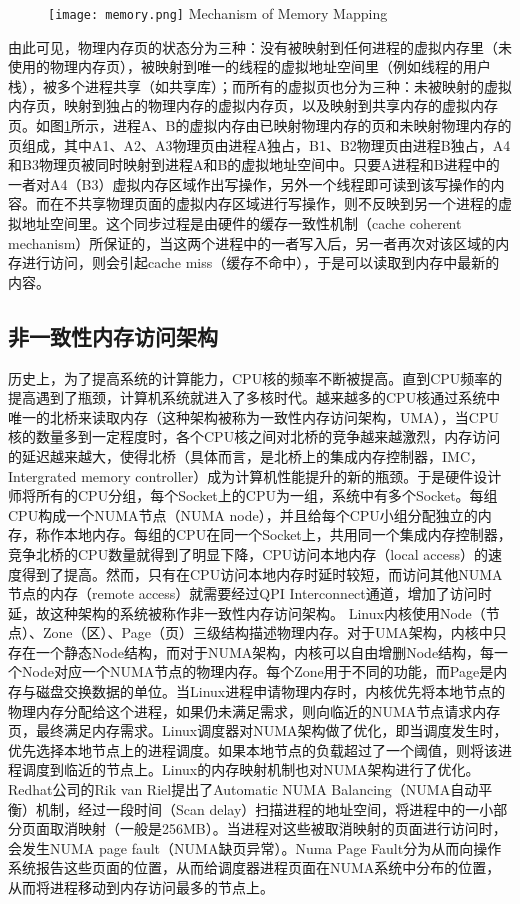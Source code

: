 \begin{figure}[!htp]
  \centering
  \texttt{[image: memory.png]}
    {Mechanism of Memory Mapping}
  \label{fig:MEM}
\end{figure}
由此可见，物理内存页的状态分为三种：没有被映射到任何进程的虚拟内存里（未使用的物理内存页），被映射到唯一的线程的虚拟地址空间里（例如线程的用户栈），被多个进程共享（如共享库）；而所有的虚拟页也分为三种：未被映射的虚拟内存页，映射到独占的物理内存的虚拟内存页，以及映射到共享内存的虚拟内存页。如图\ref{fig:MEM}所示，进程A、B的虚拟内存由已映射物理内存的页和未映射物理内存的页组成，其中A1、A2、A3物理页由进程A独占，B1、B2物理页由进程B独占，A4和B3物理页被同时映射到进程A和B的虚拟地址空间中。只要A进程和B进程中的一者对A4（B3）虚拟内存区域作出写操作，另外一个线程即可读到该写操作的内容。而在不共享物理页面的虚拟内存区域进行写操作，则不反映到另一个进程的虚拟地址空间里。这个同步过程是由硬件的缓存一致性机制（cache coherent mechanism）所保证的，当这两个进程中的一者写入后，另一者再次对该区域的内存进行访问，则会引起cache miss（缓存不命中），于是可以读取到内存中最新的内容。
\subsection{非一致性内存访问架构}
历史上，为了提高系统的计算能力，CPU核的频率不断被提高。直到CPU频率的提高遇到了瓶颈，计算机系统就进入了多核时代。越来越多的CPU核通过系统中唯一的北桥来读取内存（这种架构被称为一致性内存访问架构，UMA），当CPU核的数量多到一定程度时，各个CPU核之间对北桥的竞争越来越激烈，内存访问的延迟越来越大，使得北桥（具体而言，是北桥上的集成内存控制器，IMC，Intergrated memory controller）成为计算机性能提升的新的瓶颈。于是硬件设计师将所有的CPU分组，每个Socket上的CPU为一组，系统中有多个Socket。每组CPU构成一个NUMA节点（NUMA node），并且给每个CPU小组分配独立的内存，称作本地内存。每组的CPU在同一个Socket上，共用同一个集成内存控制器，竞争北桥的CPU数量就得到了明显下降，CPU访问本地内存（local access）的速度得到了提高。然而，只有在CPU访问本地内存时延时较短，而访问其他NUMA节点的内存（remote access）就需要经过QPI Interconnect通道，增加了访问时延，故这种架构的系统被称作非一致性内存访问架构。
\label{chap:memm}
Linux内核使用Node（节点）、Zone（区）、Page（页）三级结构描述物理内存\cite{phymem}。对于UMA架构，内核中只存在一个静态Node结构，而对于NUMA架构，内核可以自由增删Node结构，每一个Node对应一个NUMA节点的物理内存。每个Zone用于不同的功能，而Page是内存与磁盘交换数据的单位。当Linux进程申请物理内存时，内核优先将本地节点的物理内存分配给这个进程，如果仍未满足需求，则向临近的NUMA节点请求内存页，最终满足内存需求。Linux调度器对NUMA架构做了优化，即当调度发生时，优先选择本地节点上的进程调度。如果本地节点的负载超过了一个阈值，则将该进程调度到临近的节点上。Linux的内存映射机制也对NUMA架构进行了优化。Redhat公司的Rik van Riel提出了Automatic NUMA Balancing（NUMA自动平衡）机制\cite{balancing}，经过一段时间（Scan delay）扫描进程的地址空间，将进程中的一小部分页面取消映射（一般是256MB）。当进程对这些被取消映射的页面进行访问时，会发生NUMA page fault（NUMA缺页异常）。Numa Page Fault分为从而向操作系统报告这些页面的位置，从而给调度器进程页面在NUMA系统中分布的位置，从而将进程移动到内存访问最多的节点上。


